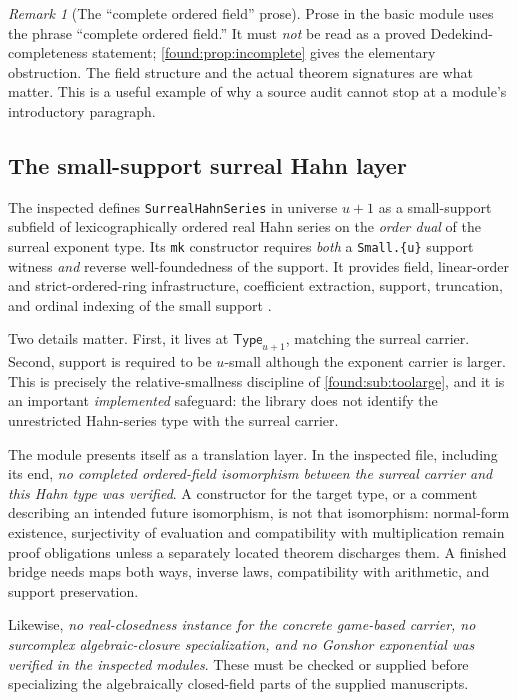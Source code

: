 \documentclass[11pt,letterpaper]{article}
\numberwithin{equation}{section}
\theoremstyle{definition}
\theoremstyle{remark}
\newtheorem{remark}[theorem]{Remark}
\newcommand{\Type}{\mathsf{Type}}
\begin{document}
\begin{remark}[The ``complete ordered field'' prose]\label{found:rem:completeprose}
Prose in the basic module uses the phrase ``complete ordered field.'' It must
\emph{not} be read as a proved Dedekind-completeness statement;
\cref{found:prop:incomplete} gives the elementary obstruction. The field
structure and the actual theorem signatures are what matter. This is a useful
example of why a source audit cannot stop at a module's introductory paragraph.
\end{remark}

\subsection{The small-support surreal Hahn layer}
\label{found:sub:hahnlayer}
The inspected  defines
\texttt{SurrealHahnSeries} in universe $u+1$ as a small-support subfield of
lexicographically ordered real Hahn series on the \emph{order dual} of the
surreal exponent type. Its \texttt{mk} constructor requires \emph{both} a
\texttt{Small.\{u\}} support witness \emph{and} reverse well-foundedness of the
support. It provides field, linear-order and strict-ordered-ring infrastructure,
coefficient extraction, support, truncation, and ordinal indexing of the small
support \cite{found:GamesHahn}.

Two details matter. First, it lives at $\Type_{u+1}$, matching the surreal
carrier. Second, support is required to be $u$-small although the exponent
carrier is larger. This is precisely the relative-smallness discipline of
\cref{found:sub:toolarge}, and it is an important \emph{implemented} safeguard:
the library does not identify the unrestricted Hahn-series type with the surreal
carrier.

The module presents itself as a translation layer. In the inspected file,
including its end, \emph{no completed ordered-field isomorphism between the
surreal carrier and this Hahn type was verified}. A constructor for the target
type, or a comment describing an intended future isomorphism, is not that
isomorphism: normal-form existence, surjectivity of evaluation and compatibility
with multiplication remain proof obligations unless a separately located theorem
discharges them. A finished bridge needs maps both ways, inverse laws,
compatibility with arithmetic, and support preservation.

Likewise, \emph{no real-closedness instance for the concrete game-based carrier,
no surcomplex algebraic-closure specialization, and no Gonshor exponential was
verified in the inspected modules}. These must be checked or supplied before
specializing the algebraically closed-field parts of the supplied manuscripts.
\end{document}
